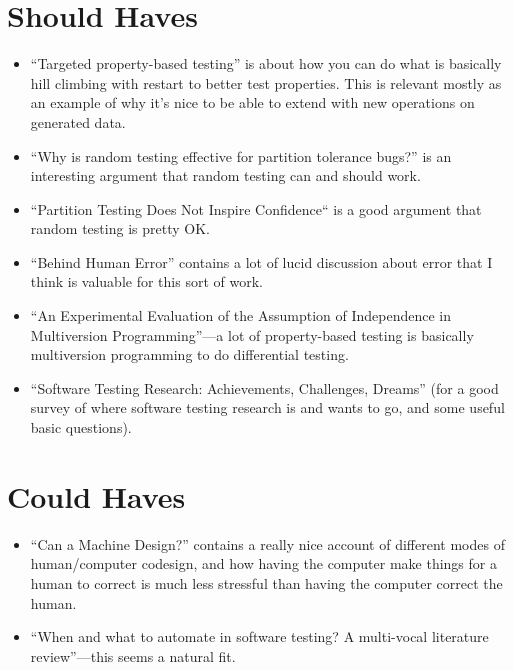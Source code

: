 \section{Should Haves}

\begin{itemize}
\item ``Targeted property-based testing''\cite{DBLP:conf/issta/LoscherS17} is about how you can do what is basically hill climbing with restart to better test properties.
This is relevant mostly as an example of why it's nice to be able to extend with new operations on generated data.
\item ``Why is random testing effective for partition tolerance bugs?''\cite{DBLP:journals/pacmpl/MajumdarN18} is an interesting argument that random testing can and should work.
\item ``Partition Testing Does Not Inspire Confidence``\cite{DBLP:journals/tse/HamletT90} is a good argument that random testing is pretty OK.\ 
\item ``Behind Human Error''\cite{BehindHumanError} contains a lot of lucid discussion about error that I think is valuable for this sort of work.
\item ``An Experimental Evaluation of the Assumption of Independence in Multiversion Programming''\cite{DBLP:journals/tse/KnightL86}---a
lot of property-based testing is basically multiversion programming to do differential testing.
\item ``Software Testing Research: Achievements, Challenges, Dreams''\cite{DBLP:conf/icse/Bertolino07} (for a good survey of where software testing research is and wants to go, and some useful basic questions).
\end{itemize}

\section{Could Haves}

\begin{itemize}
\item ``Can a Machine Design?''\cite{doi:10.1162/07479360152681083} contains a really nice account of different modes of human/computer codesign,
and how having the computer make things for a human to correct is much less stressful than having the computer correct the human.
\item ``When and what to automate in software testing? {A} multi-vocal literature review''\cite{DBLP:journals/infsof/GarousiM16}---this
seems a natural fit.
\end{itemize}

